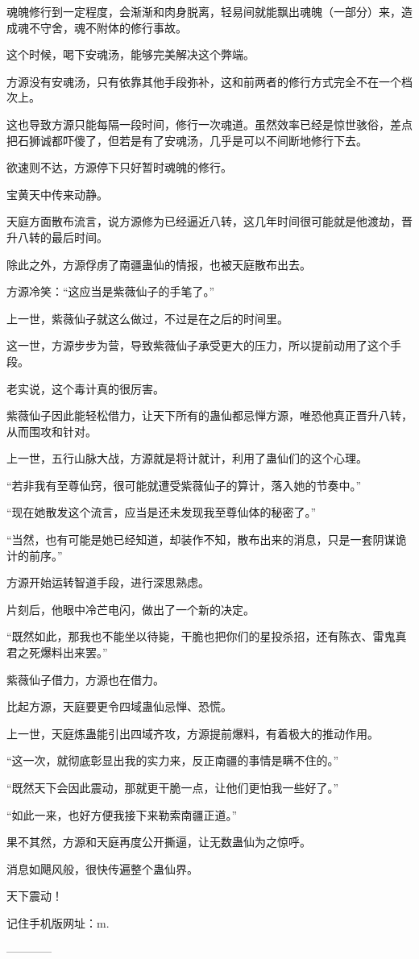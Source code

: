 \begin{this_body}
魂魄修行到一定程度，会渐渐和肉身脱离，轻易间就能飘出魂魄（一部分）来，造成魂不守舍，魂不附体的修行事故。

这个时候，喝下安魂汤，能够完美解决这个弊端。

方源没有安魂汤，只有依靠其他手段弥补，这和前两者的修行方式完全不在一个档次上。

这也导致方源只能每隔一段时间，修行一次魂道。虽然效率已经是惊世骇俗，差点把石狮诚都吓傻了，但若是有了安魂汤，几乎是可以不间断地修行下去。

欲速则不达，方源停下只好暂时魂魄的修行。

宝黄天中传来动静。

天庭方面散布流言，说方源修为已经逼近八转，这几年时间很可能就是他渡劫，晋升八转的最后时间。

除此之外，方源俘虏了南疆蛊仙的情报，也被天庭散布出去。

方源冷笑：“这应当是紫薇仙子的手笔了。”

上一世，紫薇仙子就这么做过，不过是在之后的时间里。

这一世，方源步步为营，导致紫薇仙子承受更大的压力，所以提前动用了这个手段。

老实说，这个毒计真的很厉害。

紫薇仙子因此能轻松借力，让天下所有的蛊仙都忌惮方源，唯恐他真正晋升八转，从而围攻和针对。

上一世，五行山脉大战，方源就是将计就计，利用了蛊仙们的这个心理。

“若非我有至尊仙窍，很可能就遭受紫薇仙子的算计，落入她的节奏中。”

“现在她散发这个流言，应当是还未发现我至尊仙体的秘密了。”

“当然，也有可能是她已经知道，却装作不知，散布出来的消息，只是一套阴谋诡计的前序。”

方源开始运转智道手段，进行深思熟虑。

片刻后，他眼中冷芒电闪，做出了一个新的决定。

“既然如此，那我也不能坐以待毙，干脆也把你们的星投杀招，还有陈衣、雷鬼真君之死爆料出来罢。”

紫薇仙子借力，方源也在借力。

比起方源，天庭要更令四域蛊仙忌惮、恐慌。

上一世，天庭炼蛊能引出四域齐攻，方源提前爆料，有着极大的推动作用。

“这一次，就彻底彰显出我的实力来，反正南疆的事情是瞒不住的。”

“既然天下会因此震动，那就更干脆一点，让他们更怕我一些好了。”

“如此一来，也好方便我接下来勒索南疆正道。”

果不其然，方源和天庭再度公开撕逼，让无数蛊仙为之惊呼。

消息如飓风般，很快传遍整个蛊仙界。

天下震动！

记住手机版网址：m.

------------

\end{this_body}

